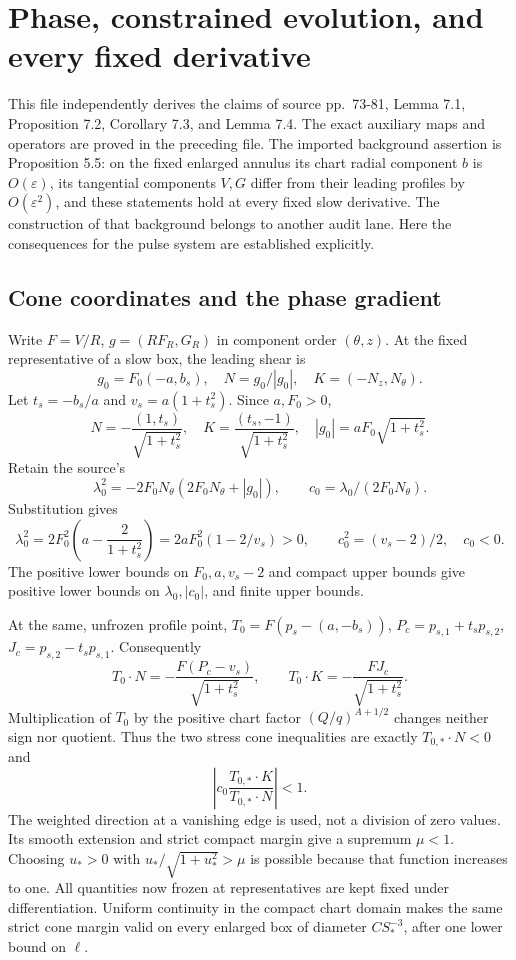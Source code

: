 \documentclass[10pt,a4paper]{article}
\begin{document}
\section{Phase, constrained evolution, and every fixed derivative}\label{phase-constrained-evolution-and-every-fixed-derivative}

This file independently derives the claims of source pp.~73-81, Lemma 7.1, Proposition 7.2, Corollary 7.3, and Lemma 7.4. The exact auxiliary maps and operators are proved in the preceding file. The imported background assertion is Proposition 5.5: on the fixed enlarged annulus its chart radial component \(b\) is \(O(\varepsilon)\), its tangential components \(V,G\) differ from their leading profiles by \(O(\varepsilon^2)\), and these statements hold at every fixed slow derivative. The construction of that background belongs to another audit lane. Here the consequences for the pulse system are established explicitly.

\subsection{Cone coordinates and the phase gradient}\label{cone-coordinates-and-the-phase-gradient}

Write \(F=V/R\), \(g=(RF_R,G_R)\) in component order \((\theta,z)\). At the fixed representative of a slow box, the leading shear is \[
g_0=F_0(-a,b_s),\quad N=g_0/|g_0|,\quad K=(-N_z,N_\theta).
\] Let \(t_s=-b_s/a\) and \(v_s=a(1+t_s^2)\). Since \(a,F_0>0\), \[
N=-\frac{(1,t_s)}{\sqrt{1+t_s^2}},\quad
K=\frac{(t_s,-1)}{\sqrt{1+t_s^2}},\quad
|g_0|=aF_0\sqrt{1+t_s^2}.
\] Retain the source's \[
\lambda_0^2=-2F_0N_\theta(2F_0N_\theta+|g_0|),
\qquad c_0=\lambda_0/(2F_0N_\theta).
\] Substitution gives \[
\lambda_0^2
=2F_0^2\left(a-\frac2{1+t_s^2}\right)
=2aF_0^2(1-2/v_s)>0,\qquad
c_0^2=(v_s-2)/2,\quad c_0<0.
\] The positive lower bounds on \(F_0,a,v_s-2\) and compact upper bounds give positive lower bounds on \(\lambda_0,|c_0|\), and finite upper bounds.

At the same, unfrozen profile point, \(T_0=F(p_s-(a,-b_s))\), \(P_c=p_{s,1}+t_sp_{s,2}\), \(J_c=p_{s,2}-t_sp_{s,1}\). Consequently \[
T_0\cdot N=-\frac{F(P_c-v_s)}{\sqrt{1+t_s^2}},
\qquad
T_0\cdot K=-\frac{FJ_c}{\sqrt{1+t_s^2}}.
\] Multiplication of \(T_0\) by the positive chart factor \((Q/q)^{A+1/2}\) changes neither sign nor quotient. Thus the two stress cone inequalities are exactly \(T_{0,*}\cdot N<0\) and \[
\left|c_0\frac{T_{0,*}\cdot K}{T_{0,*}\cdot N}\right|<1.
\] The weighted direction at a vanishing edge is used, not a division of zero values. Its smooth extension and strict compact margin give a supremum \(\mu<1\). Choosing \(u_*>0\) with \(u_*/\sqrt{1+u_*^2}>\mu\) is possible because that function increases to one. All quantities now frozen at representatives are kept fixed under differentiation. Uniform continuity in the compact chart domain makes the same strict cone margin valid on every enlarged box of diameter \(CS_*^{-3}\), after one lower bound on \(\ell\).
\end{document}
